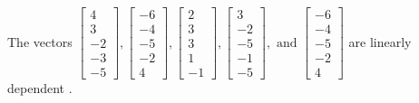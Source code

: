 \begin{exercise}
\begin{exerciseStatement}
  \end{exerciseStatement}
  \begin{exerciseAnswer}
   The vectors \(\left[\begin{array}{r}
4 \\
3 \\
-2 \\
-3 \\
-5
\end{array}\right] , \left[\begin{array}{r}
-6 \\
-4 \\
-5 \\
-2 \\
4
\end{array}\right] , \left[\begin{array}{r}
2 \\
3 \\
3 \\
1 \\
-1
\end{array}\right] , \left[\begin{array}{r}
3 \\
-2 \\
-5 \\
-1 \\
-5
\end{array}\right] , \text{ and } \left[\begin{array}{r}
-6 \\
-4 \\
-5 \\
-2 \\
4
\end{array}\right]\) are 
  	 linearly dependent  .
  


  \end{exerciseAnswer}
\end{exercise}